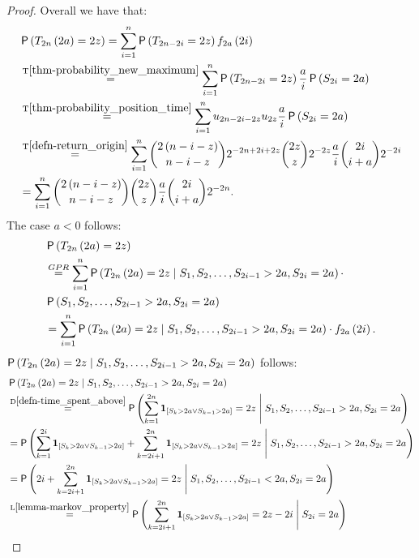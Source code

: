 \begin{proof}
  Overall we have that:
  \[
    \begin{split}
      &\pr \left(T_{2n}\left(2a\right)=2z\right)=\suma\pr \left(T_{2n-2i}=2z\right) f_{2a}\left(2i\right)\\
      &\overset{\text{T}\ref{thm-probability_new_maximum}}{=}\suma\pr \left(T_{2n-2i}=2z\right)\frac{a}{i}\pr \left(S_{2i}=2a\right)\\
      &\overset{\text{T}\ref{thm-probability_position_time}}{=}\suma u_{2n-2i-2z} u_{2z}\frac{a}{i}\pr \left(S_{2i}=2a\right)\\
      &\overset{\text{T}\ref{defn-return_origin}}{=}\suma \binom{2\left(n-i-z\right)}{n-i-z}2^{-2n+2i+2z} \binom{2z}{z}2^{-2z} \frac{a}{i} \binom{2i}{i+a}2^{-2i}\\
      &=\suma \binom{2\left(n-i-z\right)}{n-i-z}\binom{2z}{z}\frac{a}{i}\binom{2i}{i+a}2^{-2n}.\\
    \end{split}
    \]
    The case $a<0$ follows:
    \[
      \begin{split}
        &\pr \left(T_{2n}\left(2a\right)=2z\right)\\
        &\gpr \suma \pr \left(T_{2n}\left(2a\right)=2z \Mid S_1,S_2, \ldots, S_{2i-1}>2a, S_{2i}=2a\right)\cdot\\
        & \pr\left(S_1,S_2, \ldots, S_{2i-1}>2a, S_{2i}=2a\right)\\
        &=\suma \pr\left(T_{2n}\left(2a\right)=2z \Mid S_1,S_2, \ldots, S_{2i-1}>2a, S_{2i}=2a\right)\cdot f_{2a}\left(2i\right).\\
      \end{split}
    \]
    $\operatorname{\mathsf{P}}\left(T_{2n}\left(2a\right)=2z \;\middle\vert\; S_1,S_2, \ldots, S_{2i-1}>2a, S_{2i}=2a\right)$ follows:
    \[
      \begin{split}
          &\pr \left(T_{2n}\left(2a\right)=2z \Mid S_1,S_2, \ldots, S_{2i-1}>2a, S_{2i}=2a\right)\\
          &\overset{\text{D}\ref{defn-time_spent_above}}{=}\pr \left(\suma[k][1][2n] \indikator{S_k>2a \lor S_{k-1}>2a}=2z \Mid S_1,S_2, \ldots, S_{2i-1}>2a, S_{2i}=2a\right)\\
          &=\pr \left(\suma[k][1][2i] \indikator{S_k>2a \lor S_{k-1}>2a}+\suma[k][2i+1][2n] \indikator{S_k>2a \lor S_{k-1}>2a}=2z \Mid S_1,S_2, \ldots, S_{2i-1}>2a, S_{2i}=2a\right)\\
          &=\pr \left(2i+\suma[k][2i+1][2n] \indikator{S_k>2a \lor S_{k-1}>2a}=2z \Mid S_1,S_2, \ldots, S_{2i-1}<2a, S_{2i}=2a\right)\\
          &\overset{\text{L}\ref{lemma-markov_property}}{=}\pr \left(\suma[k][2i+1][2n] \indikator{S_k>2a \lor S_{k-1}>2a}=2z-2i \Mid S_{2i}=2a\right)\\

\end{split}\]
\end{proof}
